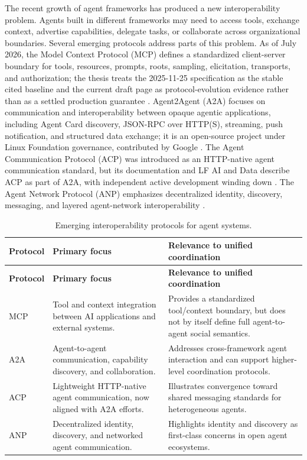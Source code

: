 The recent growth of agent frameworks has produced a new interoperability problem. Agents built in different frameworks may need to access tools, exchange context, advertise capabilities, delegate tasks, or collaborate across organizational boundaries. Several emerging protocols address parts of this problem. As of July 2026, the Model Context Protocol (MCP) defines a standardized client-server boundary for tools, resources, prompts, roots, sampling, elicitation, transports, and authorization; the thesis treats the 2025-11-25 specification as the stable cited baseline and the current draft page as protocol-evolution evidence rather than as a settled production guarantee \cite{anthropic2024mcp,modelcontextprotocol2025spec,modelcontextprotocol2026draft}. Agent2Agent (A2A) focuses on communication and interoperability between opaque agentic applications, including Agent Card discovery, JSON-RPC over HTTP(S), streaming, push notification, and structured data exchange; it is an open-source project under Linux Foundation governance, contributed by Google \cite{google2025a2a,a2aproject2025,linuxfoundation2025a2a}. The Agent Communication Protocol (ACP) was introduced as an HTTP-native agent communication standard, but its documentation and LF AI and Data describe ACP as part of A2A, with independent active development winding down \cite{ibm2025acp,acpdocs2026,lfaidata2025acp}. The Agent Network Protocol (ANP) emphasizes decentralized identity, discovery, messaging, and layered agent-network interoperability \cite{anp2025,chang2025anp}.

\begin{longtable}{p{}p{}p{}}
\caption{Emerging interoperability protocols for agent systems.}
\label{tab:protocols}\\
\toprule
\textbf{Protocol} & \textbf{Primary focus} & \textbf{Relevance to unified coordination} \\
\midrule
\endfirsthead
\toprule
\textbf{Protocol} & \textbf{Primary focus} & \textbf{Relevance to unified coordination} \\
\midrule
\endhead
MCP & Tool and context integration between AI applications and external systems. & Provides a standardized tool/context boundary, but does not by itself define full agent-to-agent social semantics. \\
A2A & Agent-to-agent communication, capability discovery, and collaboration. & Addresses cross-framework agent interaction and can support higher-level coordination protocols. \\
ACP & Lightweight HTTP-native agent communication, now aligned with A2A efforts. & Illustrates convergence toward shared messaging standards for heterogeneous agents. \\
ANP & Decentralized identity, discovery, and networked agent communication. & Highlights identity and discovery as first-class concerns in open agent ecosystems. \\
\bottomrule
\end{longtable}

